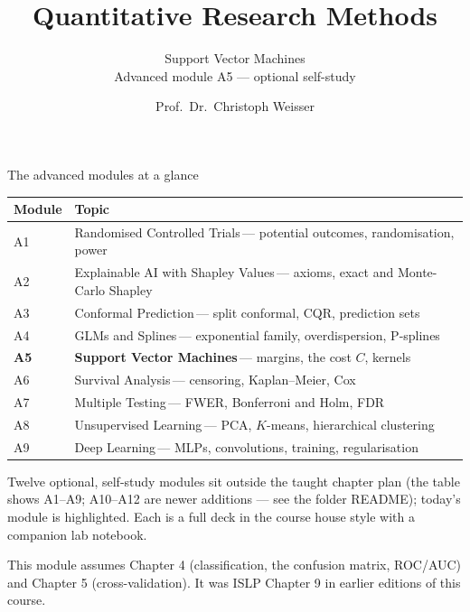 \documentclass[aspectratio=169,11pt]{beamer}
\title{Quantitative Research Methods}
\subtitle{Support Vector Machines\\[2pt]{\small Advanced module A5 --- optional self-study}}
\author{Prof.\ Dr.\ Christoph Weisser}
\date{}\graphicspath{{images/}}
\begin{document}
\begin{frame}[plain]\titlepage\end{frame}

\begin{frame}{The advanced modules at a glance}
  \vspace{-1.5mm}
  \begin{center}
  \scriptsize
  \setlength{\tabcolsep}{5pt}
  \renewcommand{\arraystretch}{1.30}
  \begin{tabular}{@{\hspace{2pt}}l >{\raggedright\arraybackslash}p{}@{\hspace{2pt}}}
    \toprule
    \textbf{Module} & \textbf{Topic} \\
    \midrule
     {\color{accent}A1} & Randomised Controlled Trials\,{\color{black!45}--- potential outcomes, randomisation, power} \\
    \rowcolor{black!3} {\color{accent}A2} & Explainable AI with Shapley Values\,{\color{black!45}--- axioms, exact and Monte-Carlo Shapley} \\
     {\color{accent}A3} & Conformal Prediction\,{\color{black!45}--- split conformal, CQR, prediction sets} \\
    \rowcolor{black!3} {\color{accent}A4} & GLMs and Splines\,{\color{black!45}--- exponential family, overdispersion, P-splines} \\
    \rowcolor{accent!18} \textbf{A5} & \textbf{Support Vector Machines}\,{\color{accent!75!black}--- margins, the cost $C$, kernels} \\
    \rowcolor{black!3} {\color{accent}A6} & Survival Analysis\,{\color{black!45}--- censoring, Kaplan--Meier, Cox} \\
     {\color{accent}A7} & Multiple Testing\,{\color{black!45}--- FWER, Bonferroni and Holm, FDR} \\
    \rowcolor{black!3} {\color{accent}A8} & Unsupervised Learning\,{\color{black!45}--- PCA, $K$-means, hierarchical clustering} \\
     {\color{accent}A9} & Deep Learning\,{\color{black!45}--- MLPs, convolutions, training, regularisation} \\
    \bottomrule
  \end{tabular}
  \end{center}
  \vspace{2mm}
  {\scriptsize Twelve optional, self-study modules sit outside the taught
  chapter plan (the table shows A1--A9; A10--A12 are newer additions --- see the folder README); today's module is highlighted. Each is a full deck in the course
  house style with a companion lab notebook.\par\medskip This module assumes Chapter 4 (classification, the confusion matrix, ROC/AUC) and Chapter 5 (cross-validation). It was ISLP Chapter 9 in earlier editions of this course.}
\end{frame}
\end{document}
